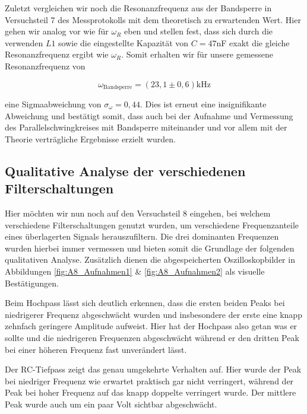 \documentclass{article}
\begin{document}
\phantom{.}

Zuletzt vergleichen wir noch die Resonanzfrequenz aus der Bandsperre in Versuchsteil 7 des Messprotokolls mit dem theoretisch zu erwartenden Wert. Hier gehen wir analog vor wie für $\omega_R$ eben und stellen fest, dass sich durch die verwenden $L1$ sowie die eingestellte Kapazität von $C = 47$nF exakt die gleiche Resonanzfrequenz ergibt wie $\omega_R$. Somit erhalten wir für unsere gemessene Resonanzfrequenz von 

\begin{equation}
    \omega_{\text{Bandsperre}} = (23,1 \pm 0,6) \text{kHz}
\end{equation}

eine Sigmaabweichung von $\sigma_\omega = 0,44$. Dies ist erneut eine insignifikante Abweichung und bestätigt somit, dass auch bei der Aufnahme und Vermessung des Parallelschwingkreises mit Bandsperre miteinander und vor allem mit der Theorie verträgliche Ergebnisse erzielt wurden. 


\clearpage
\newpage

\subsection{Qualitative Analyse der verschiedenen Filterschaltungen}

Hier möchten wir nun noch auf den Versuchsteil 8 eingehen, bei welchem verschiedene Filterschaltungen genutzt wurden, um verschiedene Frequenzanteile eines überlagerten Signals herauszufiltern. Die drei dominanten Frequenzen wurden hierbei immer vermessen und bieten somit die Grundlage der folgenden qualitativen Analyse. Zusätzlich dienen die abgespeicherten Oszilloskopbilder in Abbildungen \ref{fig:A8_Aufnahmen1} \& \ref{fig:A8_Aufnahmen2} als visuelle Bestätigungen.

Beim Hochpass lässt sich deutlich erkennen, dass die ersten beiden Peaks bei niedrigerer Frequenz abgeschwächt wurden und insbesondere der erste eine knapp zehnfach geringere Amplitude aufweist. Hier hat der Hochpass also getan was er sollte und die niedrigeren Frequenzen abgeschwächt während er den dritten Peak bei einer höheren Frequenz fast unverändert lässt. 

Der RC-Tiefpass zeigt das genau umgekehrte Verhalten auf. Hier wurde der Peak bei niedriger Frequenz wie erwartet praktisch gar nicht verringert, während der Peak bei hoher Frequenz auf das knapp doppelte verringert wurde. Der mittlere Peak wurde auch um ein paar Volt sichtbar abgeschwächt. 
\end{document}
